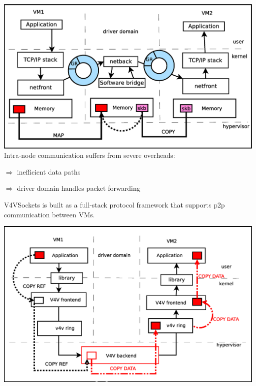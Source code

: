 \documentclass[a0paper,portrait,final]{baposter}
\begin{document}
\begin{poster}
{\begin{multicols}{2}
\includegraphics[width=\linewidth]{figures/netfront_netback.eps}
Intra-node communication suffers from severe overheads:
\begin{multicols}{2}
\setlength{\columnsep}{0.9em}
\setlength{\columnseprule}{0.0mm}
$\Rightarrow$ inefficient data paths

$\Rightarrow$ driver domain handles packet forwarding

V4VSockets is built as a full-stack protocol framework that supports
p2p communication between VMs. %
\end{multicols}


\includegraphics[width=\linewidth]{figures/v4vsockets.eps}


\end{multicols}}
\end{poster}
\end{document}
